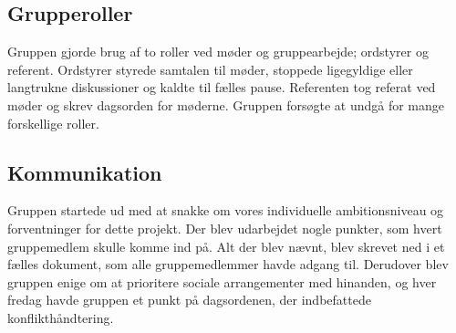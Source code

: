 \subsection{Grupperoller}
Gruppen gjorde brug af to roller ved møder og gruppearbejde; ordstyrer og referent. Ordstyrer styrede samtalen til møder, stoppede ligegyldige eller langtrukne diskussioner og kaldte til fælles pause. Referenten tog referat ved møder og skrev dagsorden for møderne. Gruppen forsøgte at undgå for mange forskellige roller.

\subsection{Kommunikation}
Gruppen startede ud med at snakke om vores individuelle ambitionsniveau og forventninger for dette projekt. Der blev udarbejdet nogle punkter, som hvert gruppemedlem skulle komme ind på. Alt der blev nævnt, blev skrevet ned i et fælles dokument, som alle gruppemedlemmer havde adgang til. Derudover blev gruppen enige om at prioritere sociale arrangementer med hinanden, og hver fredag havde gruppen et punkt på dagsordenen, der indbefattede konflikthåndtering. 

